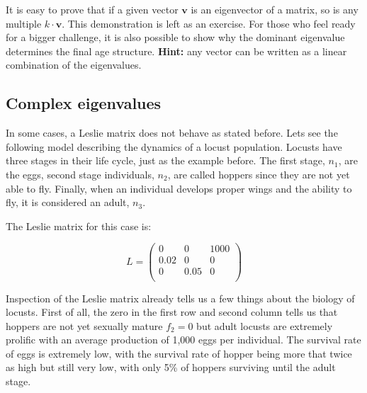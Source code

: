 \documentclass{tufte-book} %
\begin{document}
It is easy to prove that if a given vector $\mathbf{v}$ is an eigenvector of a matrix, so is any multiple $k \cdot\mathbf{v}$. This demonstration is left as an exercise. For those who feel ready for a bigger challenge, it is also possible to show why the dominant eigenvalue determines the final age structure. \textbf{Hint:} any vector can be written as a linear combination of the eigenvalues.

\subsection{Complex eigenvalues}

In some cases, a Leslie matrix does not behave as stated before. Lets see the following model describing the dynamics of a locust population. Locusts have three stages in their life cycle, just as the example before. The first stage, $n_1$, are the eggs, second stage individuals, $n_2$, are called hoppers since they are not yet able to fly. Finally, when an individual develops proper wings and the ability to fly, it is considered an adult, $n_3$.

The Leslie matrix for this case is:

\begin{equation}
L=\begin{pmatrix}
	0	&0	&1000	\\
	0.02	&0	&0	\\
	0	&0.05	&0	\\
\end{pmatrix}
\end{equation}

Inspection of the Leslie matrix already tells us a few things about the biology of locusts. First of all, the zero in the first row and second column tells us that hoppers are not yet sexually mature $f_2=0$ but adult locusts are extremely prolific with an average production of 1,000 eggs per individual. The survival rate of eggs is extremely low, with the survival rate of hopper being more that twice as high but still very low, with only 5\% of hoppers surviving until the adult stage.
\end{document}
